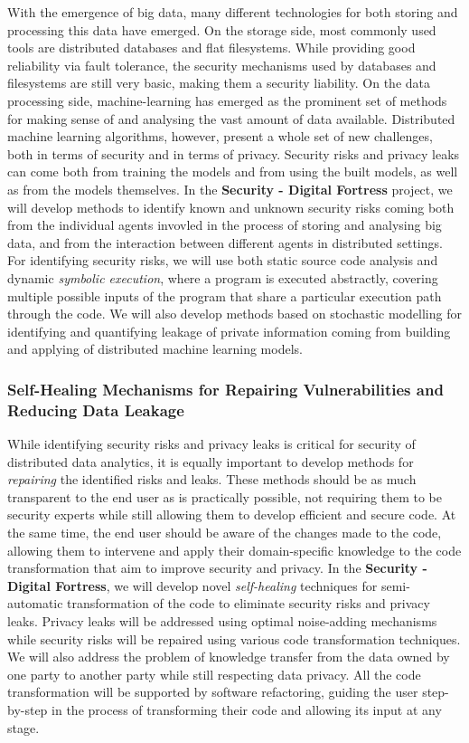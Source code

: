 \documentclass[a4paper,11pt]{article}
\newcommand{\project}[1]{\textbf{#1}\xspace}
\newcommand{\SECURITY}{\project{Security - Digital Fortress}}
\newcommand{\TheProject}{\SECURITY}
\begin{document}
With the emergence of big data, many different technologies for both storing and processing this data have emerged. On the storage side, most commonly used tools are distributed databases and flat filesystems. While providing good reliability via fault tolerance, the security mechanisms used by databases and filesystems are still very basic, making them a security liability. On the data processing side, machine-learning has emerged as the prominent set of methods for making sense of and analysing the vast amount of data available. Distributed machine learning algorithms, however, present a whole set of new challenges, both in terms of security and in terms of privacy. Security risks and privacy leaks can come both from training the models and from using the built models, as well as from the models themselves. In the \TheProject{} project, we will develop methods to identify known and unknown security risks coming both from the individual agents invovled in the process of storing and analysing big data, and from the interaction between different agents in distributed settings. For identifying security risks, we will use both static source code analysis and dynamic \emph{symbolic execution}, where a program is executed abstractly, covering multiple possible inputs of the program that share a particular execution path through the code. We will also develop methods based on stochastic modelling for identifying and quantifying leakage of private information coming from building and applying of distributed machine learning models.

\subsubsection*{Self-Healing Mechanisms for Repairing Vulnerabilities and Reducing Data Leakage}
While identifying security risks and privacy leaks is critical for security of distributed data analytics, it is equally important to develop methods for \emph{repairing} the identified risks and leaks. These methods should be as much transparent to the end user as is practically possible, not requiring them to be security experts while still allowing them to develop efficient and secure code. At the same time, the end user should be aware of the changes made to the code, allowing them to intervene and apply their domain-specific knowledge to the code transformation that aim to improve security and privacy. In the \TheProject{}, we will develop novel \emph{self-healing} techniques for semi-automatic transformation of the code to eliminate security risks and privacy leaks. Privacy leaks will be addressed using optimal noise-adding mechanisms while security risks will be repaired using various code transformation techniques. We will also address the problem of knowledge transfer from the data owned by one party to another party while still respecting data privacy. All the code transformation will be supported by software refactoring, guiding the user step-by-step in the process of transforming their code and allowing its input at any stage.
\end{document}
